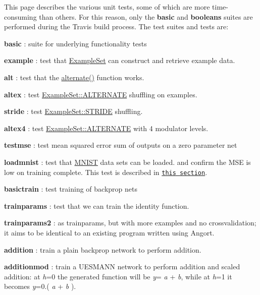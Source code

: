 This page describes the various unit tests, some of which are more time-\/consuming than others. For this reason, only the {\bfseries basic} and {\bfseries booleans} suites are performed during the Travis build process. The test suites and tests are\+:


\begin{DoxyItemize}
\item {\bfseries basic} \+: suite for underlying functionality tests
\begin{DoxyItemize}
\item {\bfseries example} \+: test that \hyperlink{classExampleSet}{Example\+Set} can construct and retrieve example data.
\item {\bfseries alt} \+: test that the \hyperlink{data_8hpp_a3f60001db133eff96da81b29a43cc8a4}{alternate()} function works.
\item {\bfseries altex} \+: test \hyperlink{classExampleSet_afcdcdbc9a02c53864997e334d8bae33dacc61e53a68e337018a03252922ebc6b1}{Example\+Set\+::\+A\+L\+T\+E\+R\+N\+A\+TE} shuffling on examples.
\item {\bfseries stride} \+: test \hyperlink{classExampleSet_afcdcdbc9a02c53864997e334d8bae33da7dfbbc7c9fb69bf8aacc556a1eaf4480}{Example\+Set\+::\+S\+T\+R\+I\+DE} shuffling.
\item {\bfseries altex4} \+: test \hyperlink{classExampleSet_afcdcdbc9a02c53864997e334d8bae33dacc61e53a68e337018a03252922ebc6b1}{Example\+Set\+::\+A\+L\+T\+E\+R\+N\+A\+TE} with 4 modulator levels.
\item {\bfseries testmse} \+: test mean squared error sum of outputs on a zero parameter net
\item {\bfseries loadmnist} \+: test that \hyperlink{classMNIST}{M\+N\+I\+ST} data sets can be loaded. and confirm the M\+SE is low on training complete. This test is described in \href{##Addition}{\tt this section}.
\end{DoxyItemize}
\item {\bfseries basictrain} \+: test training of backprop nets
\begin{DoxyItemize}
\item {\bfseries trainparams} \+: test that we can train the identity function.
\item {\bfseries trainparams2} \+: as trainparams, but with more examples and no crossvalidation; it aims to be identical to an existing program written using Angort.
\item {\bfseries addition} \+: train a plain backprop network to perform addition.
\item {\bfseries additionmod} \+: train a U\+E\+S\+M\+A\+NN network to perform addition and scaled addition\+: at {\itshape h}=0 the generated function will be {\itshape y}= {\itshape a} + {\itshape b}, while at {\itshape h}=1 it becomes {\itshape y}=0.( {\itshape a} + {\itshape b} ).

\end{DoxyItemize}
\end{DoxyItemize}
